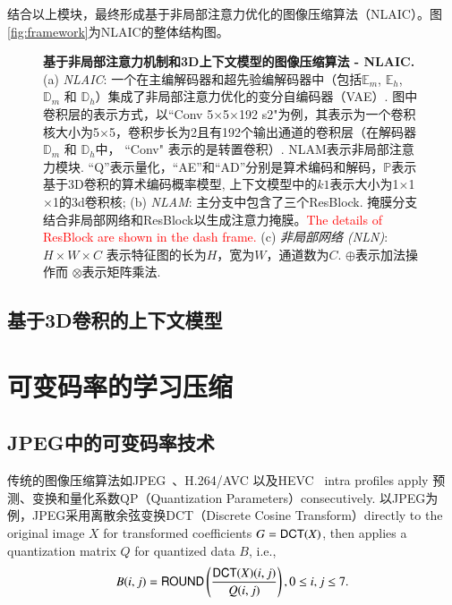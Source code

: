\documentclass[macfonts,phd,oneside,nobackinfo]{njuthesis}
\begin{document}
结合以上模块，最终形成基于非局部注意力优化的图像压缩算法（NLAIC）。图\ref{fig:framework}为NLAIC的整体结构图。
\begin{figure*}[t]
   \centering
   \hspace{20mm}
   \caption{{\bf 基于非局部注意力机制和3D上下文模型的图像压缩算法 - NLAIC.} (a) {\it NLAIC}:  一个在主编解码器和超先验编解码器中（包括$\mathbb{E}_m$, $\mathbb{E}_h$, $\mathbb{D}_m$ 和 $\mathbb{D}_h$）集成了非局部注意力优化的变分自编码器（VAE）. 图中卷积层的表示方式，以``Conv 5$\times$5$\times$192 s2"为例，其表示为一个卷积核大小为5$\times$5，卷积步长为2且有192个输出通道的卷积层（在解码器 $\mathbb{D}_m$ 和 $\mathbb{D}_h$中， ``Conv" 表示的是转置卷积）. NLAM表示非局部注意力模块.  ``Q''表示量化，``AE''和``AD''分别是算术编码和解码，$\mathbb{P}$表示基于3D卷积的算术编码概率模型, 上下文模型中的$k1$表示大小为1$\times$1$\times$1的3d卷积核; (b) {\it NLAM}: 主分支中包含了三个ResBlock. 掩膜分支结合非局部网络和ResBlock以生成注意力掩膜。\textcolor{red}{The details of ResBlock are shown in the dash frame.} (c) {\it 非局部网络 (NLN)}: $H\times{W}\times{C}$ 表示特征图的长为$H$，宽为$W$，通道数为$C$. $\oplus$表示加法操作而 $\otimes$表示矩阵乘法. }
\end{figure*}

\subsection{基于3D卷积的上下文模型}

\section{可变码率的学习压缩}
\subsection{JPEG中的可变码率技术}
传统的图像压缩算法如JPEG~\cite{Acharya2005JPEG}、H.264/AVC 以及HEVC~\cite{Sullivan2013Overview} intra profiles apply 预测、变换和量化系数QP（Quantization Parameters）consecutively. 以JPEG为例，JPEG采用离散余弦变换DCT（Discrete Cosine Transform）directly to the original image $X$ for transformed coefficients $G = {\sf DCT}(X)$, then applies a quantization matrix $Q$  for quantized data $B$, i.e.,
\begin{equation}
B(i,j) = {\sf ROUND}\left(\frac{{\sf DCT}(X)(i,j)}{Q(i,j)}\right), 0\leq i,j\leq7.
\end{equation}
\end{document}
